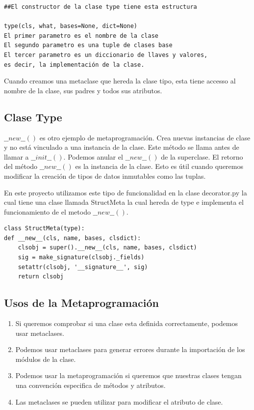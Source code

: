\documentclass{cosas/tfg_domingo}
\begin{document}
\begin{verbatim}
##El constructor de la clase type tiene esta estructura

type(cls, what, bases=None, dict=None)
El primer parametro es el nombre de la clase
El segundo parametro es una tuple de clases base
El tercer parametro es un diccionario de llaves y valores,
es decir, la implementación de la clase.
\end{verbatim}

Cuando creamos una metaclase que hereda la clase tipo, esta tiene accesso al nombre de la clase, sus padres y todos sus atributos.

\newpage

\subsection{Clase Type}
$\_\_new\_\_()$ es otro ejemplo de metaprogramación. Crea nuevas instancias de clase y no está vinculado a una instancia de la clase. Este método se llama antes de llamar a $\_\_init\_\_()$. Podemos anular el $\_\_new\_\_()$ de la superclase.
El retorno del método $\_\_new\_\_()$ es la instancia de la clase. Esto es útil cuando queremos modificar la creación de tipos de datos inmutables como las tuplas.

En este proyecto utilizamos este tipo de funcionalidad en la clase decorator.py la cual tiene una clase llamada StructMeta la cual hereda de type e implementa el funcionamiento de el metodo $\_\_new\_\_()$.
\begin{verbatim}
class StructMeta(type):
def __new__(cls, name, bases, clsdict):
    clsobj = super().__new__(cls, name, bases, clsdict)
    sig = make_signature(clsobj._fields)
    setattr(clsobj, '__signature__', sig)
    return clsobj
\end{verbatim}

\subsection{Usos de la Metaprogramación}

\begin{enumerate}
    \item Si queremos comprobar si una clase esta definida correctamente, podemos usar metaclases.
    \item Podemos usar metaclases para generar errores durante la importación de los módulos de la clase.
    \item Podemos usar la metaprogramación si queremos que nuestras clases tengan una convención especifica de métodos y atributos.
    \item Las metaclases se pueden utilizar para modificar el atributo de clase.
    \citep{Farhad}
\end{enumerate}
\end{document}
